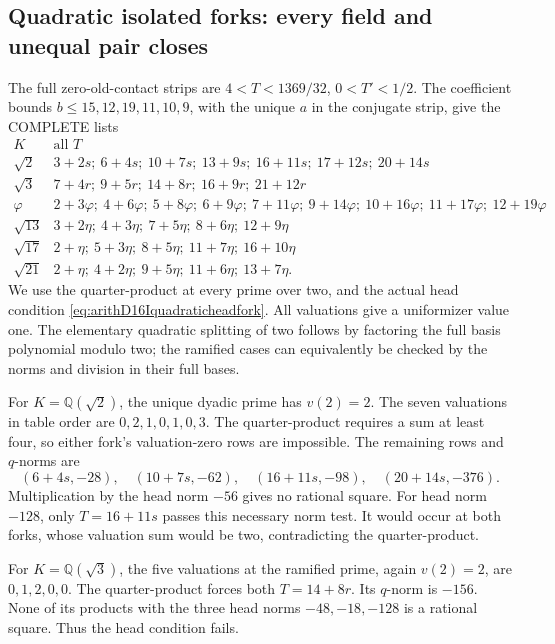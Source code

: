 \subsection{Quadratic isolated forks: every field and unequal pair closes}
\label{app:arithD16Iquadraticfinish}

The full zero-old-contact strips are
\(4<T<1369/32\), \(0<T'<1/2\).
The coefficient bounds
\(b\le15,12,19,11,10,9\), with the
unique \(a\) in the conjugate strip,
give the COMPLETE lists
\[
\begin{array}{c|l}
 K&\text{all }T\\ \hline
 \sqrt2&3+2s;\ 6+4s;\ 10+7s;\ 13+9s;\
                      16+11s;\ 17+12s;\ 20+14s\\
 \sqrt3&7+4r;\ 9+5r;\ 14+8r;\ 16+9r;\ 21+12r\\
 \varphi&2+3\varphi;\ 4+6\varphi;\ 5+8\varphi;\
  6+9\varphi;\ 7+11\varphi;\ 9+14\varphi;\
  10+16\varphi;\ 11+17\varphi;\ 12+19\varphi\\
 \sqrt{13}&3+2\eta;\ 4+3\eta;\ 7+5\eta;\ 8+6\eta;\ 12+9\eta\\
 \sqrt{17}&2+\eta;\ 5+3\eta;\ 8+5\eta;\ 11+7\eta;\ 16+10\eta\\
 \sqrt{21}&2+\eta;\ 4+2\eta;\ 9+5\eta;\ 11+6\eta;\ 13+7\eta .
\end{array}
\]
We use the quarter-product at every
prime over two, and the actual head
condition
\eqref{eq:arithD16Iquadraticheadfork}.
All valuations give a uniformizer
value one.
The elementary quadratic splitting
of two follows by factoring the full
basis polynomial modulo two;
the ramified cases can equivalently
be checked by the norms and division
in their full bases.

For \(K=\mathbb Q(\sqrt2)\), the
unique dyadic prime has \(v(2)=2\).
The seven valuations in table order
are \(0,2,1,0,1,0,3\).
The quarter-product requires a sum
at least four, so either fork's
valuation-zero rows are impossible.
The remaining rows and \(q\)-norms
are
\[
       (6+4s,-28),\quad(10+7s,-62),\quad
                     (16+11s,-98),\quad(20+14s,-376).
\]
Multiplication by the head norm
\(-56\) gives no rational square.
For head norm \(-128\), only
\(T=16+11s\) passes this necessary
norm test.
It would occur at both forks,
whose valuation sum would be two,
contradicting the quarter-product.

For \(K=\mathbb Q(\sqrt3)\), the
five valuations at the ramified
prime, again \(v(2)=2\), are
\(0,1,2,0,0\).
The quarter-product forces both
\(T=14+8r\).
Its \(q\)-norm is \(-156\).
None of its products with the three
head norms \(-48,-18,-128\) is a
rational square.
Thus the head condition fails.

